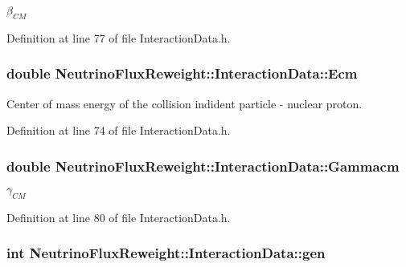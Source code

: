 $ \beta_{CM} $ 



Definition at line 77 of file Interaction\-Data.\-h.

\hypertarget{class_neutrino_flux_reweight_1_1_interaction_data_af36c192af45b741e4daefeefb2c01815}{
\subsubsection[{Ecm}]{\setlength{\rightskip}{0pt plus 5cm}double Neutrino\-Flux\-Reweight\-::\-Interaction\-Data\-::\-Ecm}}\label{class_neutrino_flux_reweight_1_1_interaction_data_af36c192af45b741e4daefeefb2c01815}


Center of mass energy of the collision indident particle -\/ nuclear proton. 



Definition at line 74 of file Interaction\-Data.\-h.

\hypertarget{class_neutrino_flux_reweight_1_1_interaction_data_a2af597e9e7f334748c1121b4a7f4c861}{
\subsubsection[{Gammacm}]{\setlength{\rightskip}{0pt plus 5cm}double Neutrino\-Flux\-Reweight\-::\-Interaction\-Data\-::\-Gammacm}}\label{class_neutrino_flux_reweight_1_1_interaction_data_a2af597e9e7f334748c1121b4a7f4c861}


$ \gamma_{CM} $ 



Definition at line 80 of file Interaction\-Data.\-h.

\hypertarget{class_neutrino_flux_reweight_1_1_interaction_data_a66f9342b71e54a2585b25fc3c72d8620}{
\subsubsection[{gen}]{\setlength{\rightskip}{0pt plus 5cm}int Neutrino\-Flux\-Reweight\-::\-Interaction\-Data\-::gen}}\label{class_neutrino_flux_reweight_1_1_interaction_data_a66f9342b71e54a2585b25fc3c72d8620}


